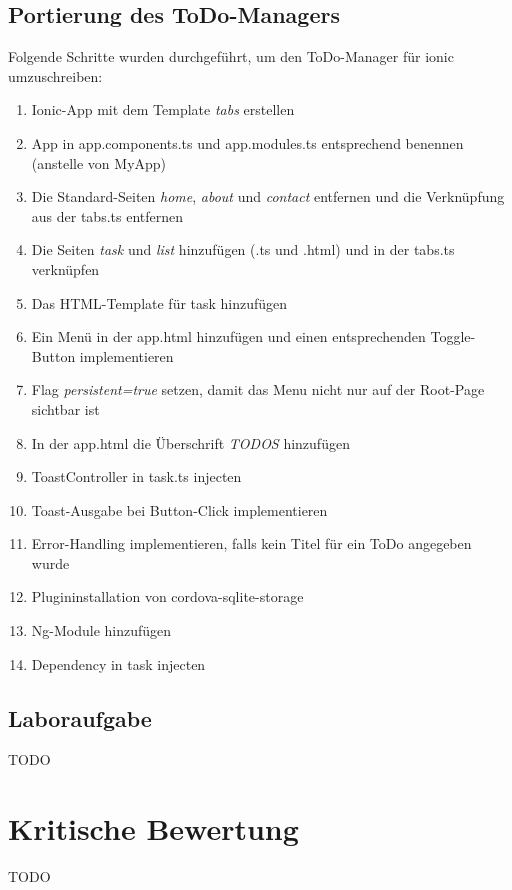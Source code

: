 \documentclass[german]{lni}
\begin{document}
\subsection{Portierung des ToDo-Managers}
Folgende Schritte wurden durchgeführt, um den ToDo-Manager für ionic umzuschreiben:
\begin{enumerate}
	\item Ionic-App mit dem Template \emph{tabs} erstellen
	\item App in app.components.ts und app.modules.ts entsprechend benennen (anstelle von MyApp)
	\item Die Standard-Seiten \emph{home}, \emph{about} und \emph{contact} entfernen und die Verknüpfung aus der tabs.ts entfernen
	\item Die Seiten \emph{task} und \emph{list} hinzufügen (.ts und .html) und in der tabs.ts verknüpfen
	\item Das HTML-Template für task hinzufügen
	\item Ein Menü in der app.html hinzufügen und einen entsprechenden Toggle-Button implementieren
	\item Flag \emph{persistent=true} setzen, damit das Menu nicht nur auf der Root-Page sichtbar ist
	\item In der app.html die Überschrift \emph{TODOS} hinzufügen
	\item ToastController in task.ts injecten
	\item Toast-Ausgabe bei Button-Click implementieren
	\item Error-Handling implementieren, falls kein Titel für ein ToDo angegeben wurde
	\item Plugininstallation von cordova-sqlite-storage	
	\item Ng-Module hinzufügen
	\item Dependency in task injecten
\end{enumerate}

\subsection{Laboraufgabe}
TODO
\section{Kritische Bewertung}
TODO

%
\end{document}
